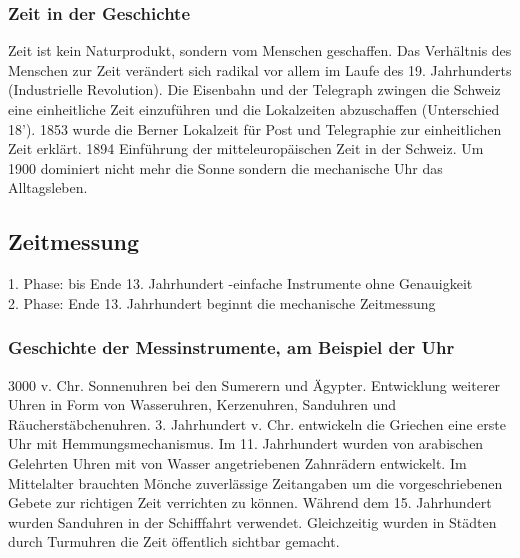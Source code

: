 \documentclass[10pt, openright=true]{scrartcl}
\begin{document}
\subsubsection{Zeit in der Geschichte}
Zeit ist kein Naturprodukt, sondern vom Menschen geschaffen. Das Verhältnis des Menschen zur Zeit verändert sich radikal vor allem im Laufe des 19. Jahrhunderts (Industrielle Revolution). Die Eisenbahn und der Telegraph zwingen die Schweiz eine einheitliche Zeit einzuführen und die Lokalzeiten abzuschaffen (Unterschied 18’). 1853 wurde die Berner Lokalzeit für Post und Telegraphie zur einheitlichen Zeit erklärt. 1894 Einführung der mitteleuropäischen Zeit in der Schweiz. Um 1900 dominiert nicht mehr die Sonne sondern die mechanische Uhr das Alltagsleben.
\subsection{Zeitmessung}
1. Phase: bis Ende 13. Jahrhundert -einfache Instrumente ohne Genauigkeit\\
2. Phase: Ende 13. Jahrhundert beginnt die mechanische Zeitmessung
\subsubsection{Geschichte der Messinstrumente, am Beispiel der Uhr}
3000 v. Chr. Sonnenuhren bei den Sumerern und Ägypter. Entwicklung weiterer Uhren in Form von Wasseruhren, Kerzenuhren, Sanduhren und Räucherstäbchenuhren. 3. Jahrhundert v. Chr. entwickeln die Griechen eine erste Uhr mit Hemmungsmechanismus. Im 11. Jahrhundert wurden von arabischen Gelehrten Uhren mit von Wasser angetriebenen Zahnrädern entwickelt. Im Mittelalter brauchten Mönche zuverlässige Zeitangaben um die vorgeschriebenen Gebete zur richtigen Zeit verrichten zu können. Während dem 15. Jahrhundert wurden Sanduhren in der Schifffahrt verwendet. Gleichzeitig wurden in Städten durch Turmuhren die Zeit öffentlich sichtbar gemacht.
\end{document}
